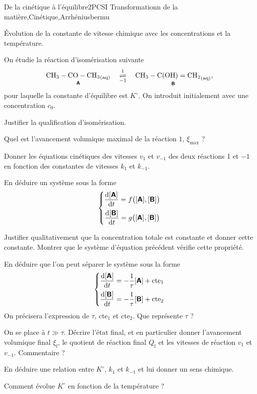 
\begin{exercise}{De la cinétique à l'équilibre}{2}{PCSI}
{Transformationn de la matière,Cinétique,Arrhénius}{bermu}

\begin{questions}
\questioncours \'Evolution de la constante de vitesse chimique avec les concentrations et la température.

\begin{EnvUplevel}
    On étudie la réaction d'isomérisation suivante
    $$\mathrm{\underset{\textbf{\textsf{A}}}{{CH_3-CO-CH_3}_{(aq)}} \quad\overset{1}{\underset{-1}{\rightleftharpoons}}\quad \underset{\textbf{\textsf{B}}}{{CH_3-C(OH)=CH_2}_{(aq)}}},$$
    pour laquelle la constante d'équilibre est $K^\circ$. On introduit initialement  avec une concentration $c_0$.
\end{EnvUplevel}

\question Justifier la qualification d'isomérisation.

\question Quel est l'avancement volumique maximal de la réaction $1$, $\xi_\text{max}$ ?

\question Donner les équations cinétiques des vitesses $v_1$ et $v_{-1}$ des deux réactions 1 et $-1$ en fonction des constantes de vitesses $k_1$ et $k_{-1}$.

\question En déduire un système sous la forme
$$\left\lbrace\mqty{\displaystyle\dv{[\textsfbf{A}]}{t} = f\qty\big([\textsfbf{A}],[\textsfbf{B}])\\[2ex] \displaystyle\dv{[\textsfbf{B}]}{t} = g\qty\big([\textsfbf{A}],[\textsfbf{B}])}\right.$$

\question Justifier qualitativement que la concentration totale est constante et donner cette constante. Montrer que le système d'équation précédent vérifie cette propriété.

\question En déduire que l'on peut séparer le système sous la forme
$$\left\lbrace\mqty{\displaystyle\dv{[\textsfbf{A}]}{t} = -\dfrac{1}{\tau}[\textsfbf{A}] + \text{cte}_1 \\[2ex] \displaystyle\dv{[\textsfbf{B}]}{t} = -\dfrac{1}{\tau}[\textsfbf{B}] + \text{cte}_2}\right.$$
On précisera l'expression de $\tau$, cte$_1$ et cte$_2$. Que représente $\tau$ ?

\question On se place à $t \gg \tau$. Décrire l'état final, et en particulier donner l'avancement volumique final $\xi_\text{f}$, le quotient de réaction final $Q_\text{f}$ et les vitesses de réaction $v_1$ et $v_{-1}$. Commentaire ?

\question En déduire une relation entre $K^\circ$, $k_1$ et $k_{-1}$ et lui donner un sens chimique. 

\question Comment évolue $K^\circ$ en fonction de la température ?



\end{questions}


\end{exercise}

